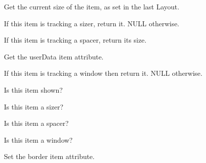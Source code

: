 
Get the current size of the item, as set in the last Layout.

\label{wxsizeritemgetsizer}


If this item is tracking a sizer, return it.  NULL otherwise.


\label{wxsizeritemgetspacer}


If this item is tracking a spacer, return its size.


\label{wxsizeritemgetuserdata}


Get the userData item attribute.


\label{wxsizeritemgetwindow}


If this item is tracking a window then return it.  NULL otherwise.

\label{wxsizeritemisshown}


Is this item shown?


\label{wxsizeritemissizer}


Is this item a sizer?


\label{wxsizeritemisspacer}


Is this item a spacer?


\label{wxsizeritemiswindow}


Is this item a window?


\label{wxsizeritemsetborder}


Set the border item attribute.

\label{wxsizeritemsetdimension}

